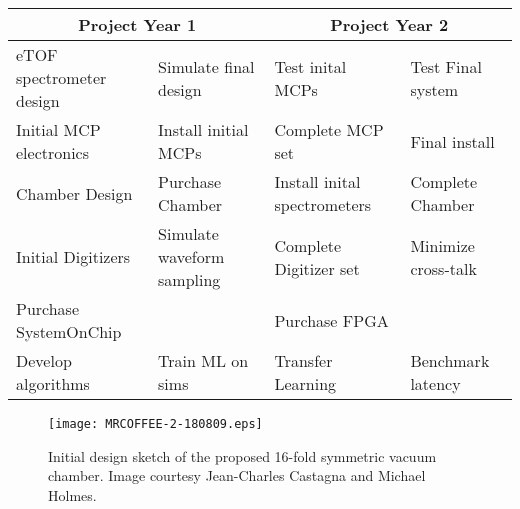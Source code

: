 \small
\begin{tabular}{l|l|l|l}
\multicolumn{2}{c|}{Project Year 1} &  \multicolumn{2}{c}{Project Year 2} \\
\hline
eTOF spectrometer design & Simulate final design & Test inital MCPs & Test Final system\\
Initial MCP electronics & Install initial MCPs & Complete MCP set & Final install\\
Chamber Design & Purchase Chamber& Install inital spectrometers & Complete Chamber\\
Initial Digitizers & Simulate waveform sampling& Complete Digitizer set & Minimize cross-talk\\
\hline
Purchase SystemOnChip & & Purchase FPGA &\\
Develop algorithms& Train ML on sims & Transfer Learning & Benchmark latency\\
\hline
\end{tabular}
\normalsize

\begin{wrapfigure}[18]{r}{3in}
\vspace{-.75\baselineskip}
\centerline{\texttt{[image: MRCOFFEE-2-180809.eps]}}
\vspace{-.25\baselineskip}
\caption{\label{fig::mrcoffee} Initial design sketch of the proposed 16-fold symmetric vacuum chamber. Image courtesy Jean-Charles Castagna and Michael Holmes.}
\end{wrapfigure}
